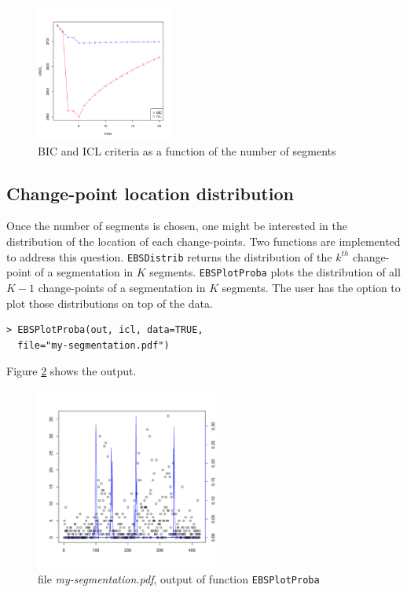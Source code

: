 \documentclass{bioinfo}
\begin{document}
\begin{methods}
\begin{verbatim}
\end{verbatim}


\begin{figure}[!h]%
\centerline{\includegraphics[width=4.5cm]{icl-bic.pdf}}
\caption{BIC and ICL criteria as a function of the number of segments} \label{fig:01}
\end{figure}






\subsection{Change-point location distribution}

Once the number of segments is chosen, one might be interested in the distribution of the location of each change-points. Two functions are implemented to address this question. \texttt{EBSDistrib} returns the distribution of the $k^{th}$ change-point of a segmentation in $K$ segments. \texttt{EBSPlotProba} plots the distribution of all $K\!-\!1$ change-points of a segmentation in $K$ segments. The user has the option to plot those distributions on top of the data. 
\begin{verbatim}
> EBSPlotProba(out, icl, data=TRUE,
  file="my-segmentation.pdf")
\end{verbatim}

Figure \ref{fig:02} shows the output. 

\begin{figure}[!h]%
\centerline{\includegraphics[width=6cm]{my-segmentation.pdf}}
\caption{file \textit{my-segmentation.pdf}, output of function \texttt{EBSPlotProba}}\label{fig:02}
\end{figure}





\end{methods}
\end{document}
